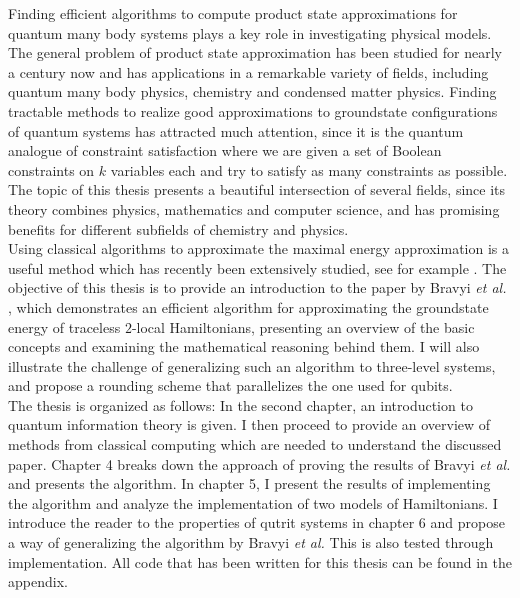 Finding efficient algorithms to compute product state approximations for quantum many body systems plays a key role in investigating physical models.
The general problem of product state approximation has been studied for nearly a century now and has applications in a remarkable variety of fields, including quantum many body physics, chemistry and condensed matter physics.
Finding tractable methods to realize good approximations to groundstate configurations of quantum systems has attracted much attention, since it is the quantum analogue of constraint satisfaction where we are given a set of Boolean constraints on $k$ variables each and try to satisfy as many constraints as possible.
The topic of this thesis presents a beautiful intersection of several fields, since its theory combines physics, mathematics and computer science, and has promising benefits for different subfields of chemistry and physics.\\
Using classical algorithms to approximate the maximal energy approximation is a useful method which has recently been extensively studied, see for example \cite{gharibian19, gharibian12, kempe06, brandao14, harrow17,bravyi19,anshu20}.
The objective of this thesis is to provide an introduction to the paper by Bravyi \emph{et al.} \cite{bravyi19}, which demonstrates an efficient algorithm for approximating the groundstate energy of traceless $2$-local Hamiltonians, presenting an overview of the basic concepts and examining the mathematical reasoning behind them.
I will also illustrate the challenge of generalizing such an algorithm to three-level systems, and propose a rounding scheme that parallelizes the one used for qubits.\\
The thesis is organized as follows:
In the second chapter, an introduction to quantum information theory is given.
I then proceed to provide an overview of methods from classical computing which are needed to understand the discussed paper.
Chapter 4 breaks down the approach of proving the results of Bravyi \emph{et al.} and presents the algorithm.
In chapter 5, I present the results of implementing the algorithm and analyze the implementation of two models of Hamiltonians.
I introduce the reader to the properties of qutrit systems in chapter 6 and propose a way of generalizing the algorithm by Bravyi \emph{et al.}
This is also tested through implementation.
All code that has been written for this thesis can be found in the appendix.

